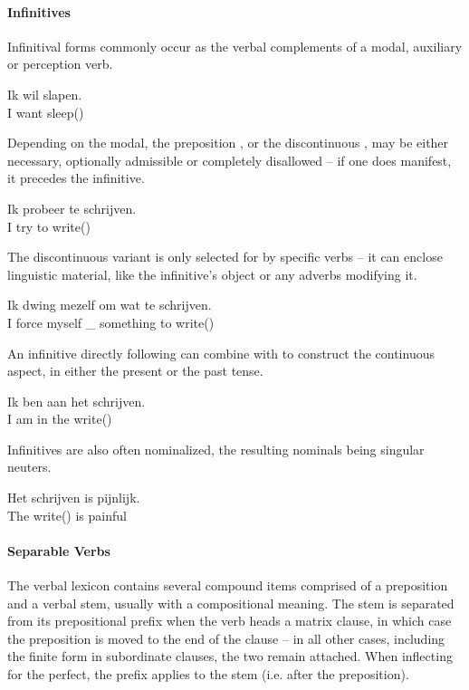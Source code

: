 \paragraph{Infinitives}
Infinitival forms commonly occur as the verbal complements of a modal, auxiliary or perception verb.
\begin{exe}
\ex
\gll Ik wil slapen.\\
I want sleep()\\
\end{exe}
Depending on the modal, the preposition , or the discontinuous , may be either necessary, optionally admissible or completely disallowed -- if one does manifest, it precedes the infinitive.
\begin{exe}
\ex
\gll Ik probeer te schrijven.\\
I try to write()\\
\end{exe}
The discontinuous variant is only selected for by specific verbs -- it can enclose linguistic material, like the infinitive's object or any adverbs modifying it.
\begin{exe}
\ex
\gll Ik dwing mezelf om wat te schrijven.\\
I force myself \_ something to write()\\
\end{exe}
An infinitive directly following  can combine with  to construct the continuous aspect, in either the present or the past tense.
\begin{exe}
\ex
\gll Ik ben aan het schrijven.\\
I am in the write()\\
\end{exe}
Infinitives are also often nominalized, the resulting nominals being singular neuters.
\begin{exe}
\ex
\gll Het schrijven is pijnlijk.\\
The write() is painful\\
\end{exe}

\paragraph{Separable Verbs} 
The verbal lexicon contains several compound items comprised of a preposition and a verbal stem, usually with a compositional meaning.
The stem is separated from its prepositional prefix when the verb heads a matrix clause, in which case the preposition is moved to the end of the clause -- in all other cases, including the finite form in subordinate clauses, the two remain attached.
When inflecting for the perfect, the prefix applies to the stem (i.e. after the preposition).

